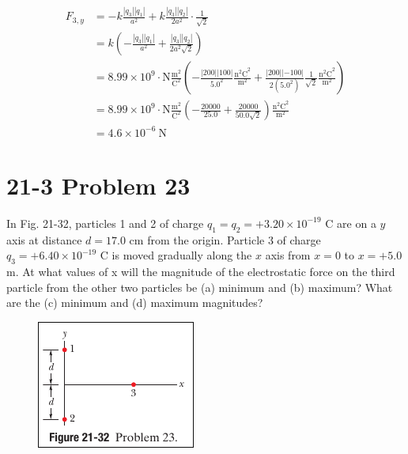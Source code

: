 \documentclass{article}
\begin{document}
\begin{align*}
    F_{3, y} &= -k \frac{|q_3||q_1|}{a^2} + k \frac{|q_3||q_2|}{2a^2} \cdot \frac{1}{\sqrt{2}} \\
    &= k \left( -\frac{|q_3||q_1|}{a^2} + \frac{|q_3||q_2|}{2a^2\sqrt{2}} \right) \\
    &= 8.99 \times 10^9 \cdot \text{N} \frac{\text{m}^2}{\text{C}^2} \left( -\frac{|200||100|}{5.0^2} \frac{\text{n$^2$C}^2}{\text{m}^2} + \frac{|200||-100|}{2(5.0^2)} \frac{1}{\sqrt{2}} \frac{\text{n$^2$C}^2}{\text{m}^2} \right) \\
    &= 8.99 \times 10^9 \cdot \text{N} \frac{\text{m}^2}{\text{C}^2} \left( -\frac{20000}{25.0} + \frac{20000}{50.0 \sqrt{2}}  \right) \frac{\text{n$^2$C}^2}{\text{m}^2}\\
    &= \boxed{4.6 \times 10^{-6} \ \text{N}}
\end{align*}

\section*{21-3 Problem 23}
In Fig. 21-32, particles 1 and 2 of charge $q_1 = q_2 = +3.20 \times 10^{-19}$ C are on a $y$ axis at distance $d = 17.0$ cm from the origin.
Particle 3 of charge $q_3 = +6.40 \times 10^{-19}$ C is moved gradually along the $x$ axis from $x = 0$ to $x = +5.0$ m.
At what values of x will the magnitude of the electrostatic force on the third particle from the other two particles be
(a) minimum and
(b) maximum? What are
the
(c) minimum and
(d) maximum magnitudes?

\begin{figure}[ht]
    \centering
    \includegraphics[scale=0.75]{image-5.png}
\end{figure}
\end{document}
